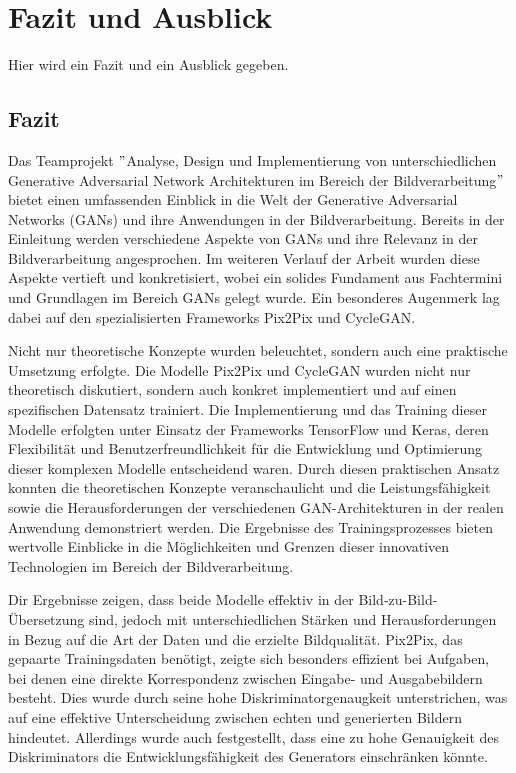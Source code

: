 \chapter{Fazit und Ausblick}
Hier wird ein Fazit und ein Ausblick gegeben.

\section{Fazit}
Das Teamprojekt $"$Analyse, Design und Implementierung von unterschiedlichen Generative Adversarial Network Architekturen im Bereich der Bildverarbeitung$"$ bietet einen umfassenden Einblick in die Welt der Generative Adversarial Networks (GANs) und ihre Anwendungen in der Bildverarbeitung. Bereits in der Einleitung werden verschiedene Aspekte von GANs und ihre Relevanz in der Bildverarbeitung angesprochen. Im weiteren Verlauf der Arbeit wurden diese Aspekte vertieft und konkretisiert, wobei ein solides Fundament aus Fachtermini und Grundlagen im Bereich GANs gelegt wurde. Ein besonderes Augenmerk lag dabei auf den spezialisierten Frameworks Pix2Pix und CycleGAN.

Nicht nur theoretische Konzepte wurden beleuchtet, sondern auch eine praktische Umsetzung erfolgte. Die Modelle Pix2Pix und CycleGAN wurden nicht nur theoretisch diskutiert, sondern auch konkret implementiert und auf einen spezifischen Datensatz trainiert. Die Implementierung und das Training dieser Modelle erfolgten unter Einsatz der Frameworks TensorFlow und Keras, deren Flexibilität und Benutzerfreundlichkeit für die Entwicklung und Optimierung dieser komplexen Modelle entscheidend waren. Durch diesen praktischen Ansatz konnten die theoretischen Konzepte veranschaulicht und die Leistungsfähigkeit sowie die Herausforderungen der verschiedenen GAN-Architekturen in der realen Anwendung demonstriert werden. Die Ergebnisse des Trainingsprozesses bieten wertvolle Einblicke in die Möglichkeiten und Grenzen dieser innovativen Technologien im Bereich der Bildverarbeitung.

Dir Ergebnisse zeigen, dass beide Modelle effektiv in der Bild-zu-Bild-Übersetzung sind, jedoch mit unterschiedlichen Stärken und Herausforderungen in Bezug auf die Art der Daten und die erzielte Bildqualität.\newline
Pix2Pix, das gepaarte Trainingsdaten benötigt, zeigte sich besonders effizient bei Aufgaben, bei denen eine direkte Korrespondenz zwischen Eingabe- und Ausgabebildern besteht. Dies wurde durch seine hohe Diskriminatorgenaugkeit unterstrichen, was auf eine effektive Unterscheidung zwischen echten und generierten Bildern hindeutet. Allerdings wurde auch festgestellt, dass eine zu hohe Genauigkeit des Diskriminators die Entwicklungsfähigkeit des Generators einschränken könnte.\newline

